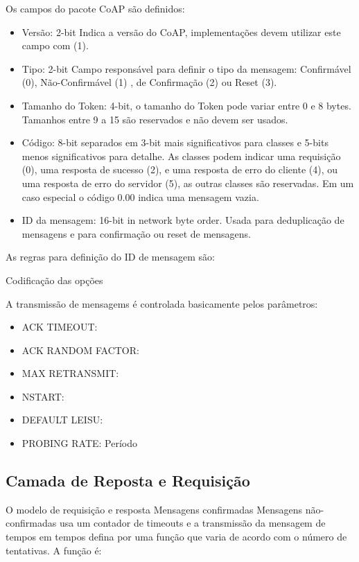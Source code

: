 Os campos do pacote CoAP s\~ao definidos:
\begin{itemize}
    \item Vers\~ao: 2-bit Indica a vers\~ao do CoAP, implementa\c{c}\~oes devem utilizar este campo com (1).
    \item Tipo: 2-bit Campo responsável para definir o tipo da mensagem: Confirm\'avel (0), N\~ao-Confirm\'avel (1) , de Confirma\c{c}\~ao (2) ou Reset (3).
    \item Tamanho do Token: 4-bit, o tamanho do Token pode variar entre 0 e 8 bytes. Tamanhos entre 9 a 15 s\~ao reservados e n\~ao devem ser usados.
    \item C\'odigo: 8-bit separados em 3-bit mais significativos para classes e 5-bits menos significativos para detalhe. As classes podem indicar uma requisi\c{c}\~ao (0), uma resposta de sucesso (2), e uma resposta de erro do cliente (4), ou uma resposta de erro do servidor (5), as outras classes s\~ao reservadas. Em um caso especial o c\'odigo 0.00 indica uma mensagem vazia.
    \item ID da mensagem: 16-bit in network byte order. Usada para deduplica\c{c}\~ao de mensagens e para confirmação ou reset de mensagens.
\end{itemize}

As regras para defini\c{c}\~ao do ID de mensagem s\~ao:
   
Codifica\c{c}\~ao das op\c{c}\~oes

A transmiss\~ao de mensagems \'e controlada basicamente pelos par\^ametros:
\begin{itemize}
    \item ACK TIMEOUT:
    \item ACK RANDOM FACTOR:
    \item MAX RETRANSMIT:
    \item NSTART:
    \item DEFAULT LEISU:
    \item PROBING RATE: Período
\end{itemize}

\subsection{Camada de Reposta e Requisi\c{c}\~ao}
 O modelo de requisi\c{c}\~ao e resposta Mensagens confirmadas Mensagens n\~ao-confirmadas usa um contador de timeouts e a transmiss\~ao da mensagem de tempos em tempos defina por uma fun\c{c}\~ao que varia de acordo com o n\'umero de tentativas. A fun\c{c}\~ao \'e:
 
